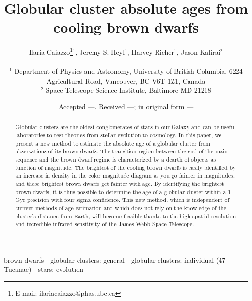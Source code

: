 \documentclass[useAMS,usenatbib]{mnras}
\title[Brown-Dwarf Ages]{Globular cluster absolute ages from cooling brown dwarfs}
\author[Caiazzo et al.]{Ilaria Caiazzo\thanks{E-mail:  ilariacaiazzo@phas.ubc.ca}$^{1}$, Jeremy S. Heyl$^{1}$, Harvey Richer$^{1}$, Jason Kalirai$^{2}$\\
\\
$^{1}$ Department of Physics and Astronomy, University of British Columbia, 6224 Agricultural Road, Vancouver, BC V6T 1Z1, Canada\\
$^{2}$ Space Telescope Science Institute, Baltimore MD 21218 
}
\begin{document}
 

\date{Accepted ---. Received ---; in original form ---}

\pagerange{\pageref{firstpage}--\pageref{lastpage}} 

\maketitle 

\label{firstpage}

\begin{abstract}
Globular clusters are the oldest conglomerates of stars in our Galaxy and can be useful laboratories to test theories from stellar evolution to cosmology. In this paper, we present a new method to estimate the absolute age of a globular cluster from observations of its brown dwarfs. The transition region between the end of the main sequence and the brown dwarf regime is characterized by a dearth of objects as function of magnitude. The brightest of the cooling brown dwarfs is easily identified by an increase in density in the color magnitude diagram as you go fainter in magnitudes, and these brightest brown dwarfs get fainter with age. By identifying the brightest brown dwarfs, it is thus possible to determine the age of a globular cluster within a 1 Gyr precision with four-sigma confidence. This new method, which is independent of current methods of age estimation and which does not rely on the knowledge of the cluster's distance from Earth, will become feasible thanks to the high spatial resolution and incredible infrared sensitivity of the James Webb Space Telescope. 
\end{abstract}
\begin{keywords}
  brown dwarfs - globular clusters: general - globular clusters: individual (47 Tucanae) - stars: evolution
\end{keywords}

\end{document}
